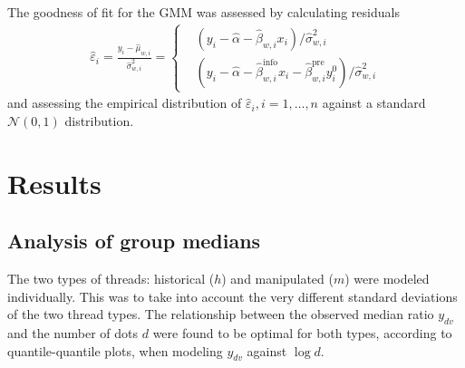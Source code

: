 \documentclass[10pt,a4paper,twocolumn,lineno]{article}
\begin{document}
The goodness of fit for the GMM was assessed by calculating residuals
\begin{align}
 	\hat{\varepsilon}_i = \frac{y_i - \hat{\mu}_{w,i}}{\hat{\sigma}^2_{w,i}} = \begin{cases}
																							& (y_i - \hat{\alpha}-\hat{\beta}_{w,i}x_i)/\hat{\sigma}^2_{w,i} \\
																							& (y_i - \hat{\alpha}-\hat{\beta}^{\text{info}}_{w,i}x_i-\hat{\beta}^{\text{pre}}_{w,i}y^0_i)/\hat{\sigma}^2_{w,i}
																					\end{cases} \label{eq: GMM residuals}
\end{align}
and assessing the empirical distribution of $\hat{\varepsilon}_i, i=1,\dots,n$ against a standard $\mathcal{N}(0,1)$ distribution.









\section{Results}
\subsection{Analysis of group medians}
The two types of threads: historical ($h$) and manipulated ($m$) were modeled individually. This was to take into account the very different standard deviations of the two thread types. The relationship between the observed median ratio $y_{dv}$ and the number of dots $d$ were found to be optimal for both types, according to quantile-quantile plots, when modeling $y_{dv}$ against $\log{d}$. 
\end{document}
